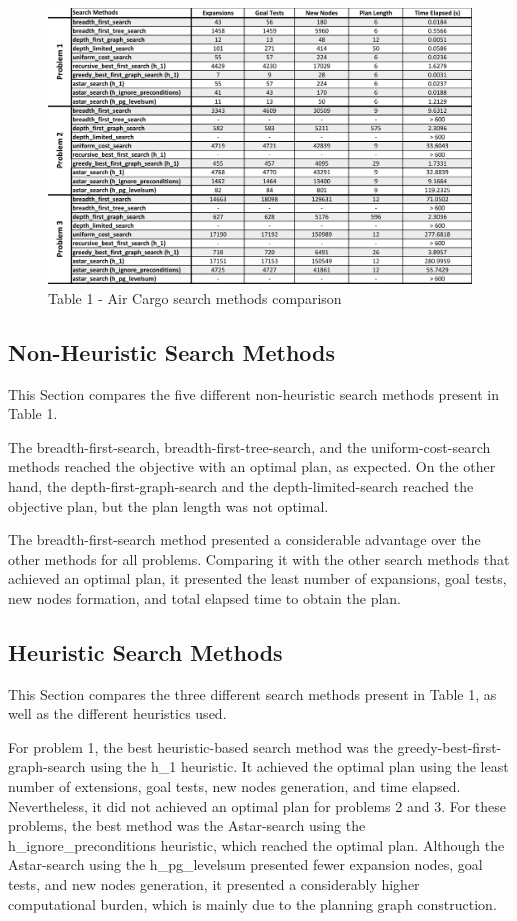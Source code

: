 \documentclass[12pt, a4paper]{article}
\begin{document}
	\begin{figure}[h]
		\centering
		\caption*{Table 1 - Air Cargo search methods comparison}
		\label{tab:table1}
		\includegraphics[width=1\linewidth]{Table1}
	\end{figure}

	\subsection{Non-Heuristic Search Methods}
	
	This Section compares the five different non-heuristic search methods present in Table 1. 
	
	The breadth-first-search, breadth-first-tree-search, and the uniform-cost-search methods reached the objective with an optimal plan, as expected. On the other hand, the depth-first-graph-search and the depth-limited-search reached the objective plan, but the plan length was not optimal. 
	
	The breadth-first-search method presented a considerable advantage over the other methods for all problems. Comparing it with the other search methods that achieved an optimal plan, it presented the least number of expansions, goal tests, new nodes formation, and total elapsed time to obtain the plan.
	
	
	\subsection{Heuristic Search Methods}
	
	This Section compares the three different search methods present in Table 1, as well as the different heuristics used.
	
	For problem 1, the best heuristic-based search method was the greedy-best-first-graph-search using the h{\_}1 heuristic. It achieved the optimal plan using the least number of extensions, goal tests, new nodes generation, and time elapsed. Nevertheless, it did not achieved an optimal plan for problems 2 and 3. For these problems, the best method was the Astar-search using the h{\_}ignore{\_}preconditions heuristic, which reached the optimal plan. Although the Astar-search using the h{\_}pg{\_}levelsum presented fewer expansion nodes, goal tests, and new nodes generation, it presented a considerably higher computational burden, which is mainly due to the planning graph construction.
	
\end{document}

